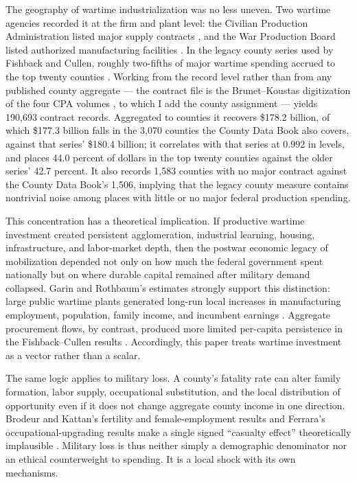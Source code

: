 \documentclass[12pt]{article}
\newcommand{\parencite}[1]{\citep{#1}}
\begin{document}
The geography of wartime industrialization was no less uneven. Two wartime agencies recorded it at the firm and plant level: the Civilian Production Administration listed major supply contracts \parencite{cpaContracts1946}, and the War Production Board listed authorized manufacturing facilities \parencite{wpbFacilities1945}. In the legacy county series used by Fishback and Cullen, roughly two-fifths of major wartime spending accrued to the top twenty counties \parencite{fishback2013}. Working from the record level rather than from any published county aggregate --- the contract file is the Brunet--Koustas digitization of the four CPA volumes \parencite{brunet2017}, to which I add the county assignment --- yields 190{,}693 contract records. Aggregated to counties it recovers \$178.2 billion, of which \$177.3 billion falls in the 3{,}070 counties the County Data Book also covers, against that series' \$180.4 billion; it correlates with that series at $0.992$ in levels, and places 44.0 percent of dollars in the top twenty counties against the older series' 42.7 percent. It also records 1{,}583 counties with no major contract against the County Data Book's 1{,}506, implying that the legacy county measure contains nontrivial noise among places with little or no major federal production spending.

This concentration has a theoretical implication. If productive wartime investment created persistent agglomeration, industrial learning, housing, infrastructure, and labor-market depth, then the postwar economic legacy of mobilization depended not only on how much the federal government spent nationally but on where durable capital remained after military demand collapsed. Garin and Rothbaum's estimates strongly support this distinction: large public wartime plants generated long-run local increases in manufacturing employment, population, family income, and incumbent earnings \parencite{garin2025}. Aggregate procurement flows, by contrast, produced more limited per-capita persistence in the Fishback--Cullen results \parencite{fishback2013}. Accordingly, this paper treats wartime investment as a vector rather than a scalar.

The same logic applies to military loss. A county's fatality rate can alter family formation, labor supply, occupational substitution, and the local distribution of opportunity even if it does not change aggregate county income in one direction. Brodeur and Kattan's fertility and female-employment results and Ferrara's occupational-upgrading results make a single signed ``casualty effect'' theoretically implausible \parencite{brodeur2022,ferrara2022}. Military loss is thus neither simply a demographic denominator nor an ethical counterweight to spending. It is a local shock with its own mechanisms.
\end{document}
